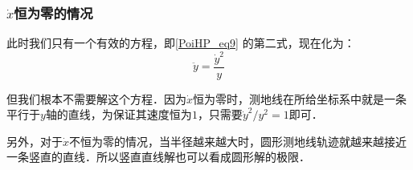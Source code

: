 \subsubsection{$\dot{x}$恒为零的情况}

{}

此时我们只有一个有效的方程，即\autoref{PoiHP_eq9} 的第二式，现在化为：
\begin{equation}
\ddot{y}=\frac{\dot{y}^2}{y}
\end{equation}

但我们根本不需要解这个方程．因为$\dot{x}$恒为零时，测地线在所给坐标系中就是一条平行于$y$轴的直线，为保证其速度恒为$1$，只需要$\dot{y}^2/y^2=1$即可．

另外，对于$\dot{x}$不恒为零的情况，当半径越来越大时，圆形测地线轨迹就越来越接近一条竖直的直线．所以竖直直线解也可以看成圆形解的极限．






